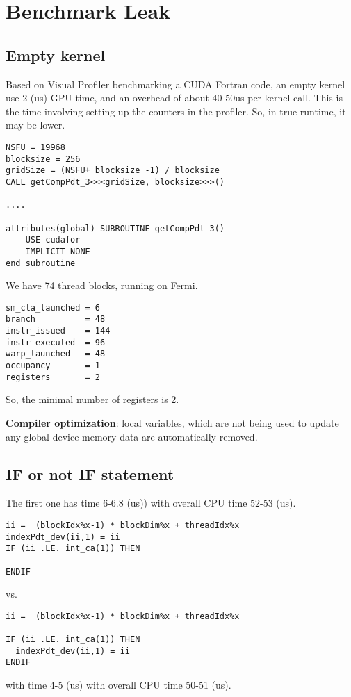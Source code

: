 
\chapter{Benchmark Leak}
\label{chap:benchmark-leak}

\section{Empty kernel}
\label{sec:empty-kernel}

Based on Visual Profiler benchmarking a CUDA Fortran code, an empty
kernel use 2 (us) GPU time, and an overhead of about 40-50us per
kernel call. This is the time involving setting up the counters in the
profiler. So, in true runtime, it may be lower. 


\begin{lstlisting}
NSFU = 19968
blocksize = 256
gridSize = (NSFU+ blocksize -1) / blocksize
CALL getCompPdt_3<<<gridSize, blocksize>>>()

....

attributes(global) SUBROUTINE getCompPdt_3()
    USE cudafor
    IMPLICIT NONE
end subroutine
\end{lstlisting}
We have 74 thread blocks, running on Fermi.


\begin{verbatim}
sm_cta_launched = 6
branch          = 48
instr_issued    = 144
instr_executed  = 96
warp_launched   = 48
occupancy       = 1
registers       = 2
\end{verbatim}
So, the minimal number of registers is 2.

\begin{framed}
  {\bf Compiler optimization}: local variables, which are not being
  used to update any global device memory data are automatically
  removed.
\end{framed}

\section{IF or not IF statement}
\label{sec:if-or-not}

The first one has time 6-6.8 (us)) with overall CPU time 52-53 (us).
\begin{lstlisting}
ii =  (blockIdx%x-1) * blockDim%x + threadIdx%x
indexPdt_dev(ii,1) = ii
IF (ii .LE. int_ca(1)) THEN

ENDIF
\end{lstlisting}
vs. 
\begin{lstlisting}
ii =  (blockIdx%x-1) * blockDim%x + threadIdx%x

IF (ii .LE. int_ca(1)) THEN
  indexPdt_dev(ii,1) = ii
ENDIF
\end{lstlisting}
with time 4-5 (us) with overall CPU time 50-51 (us).

